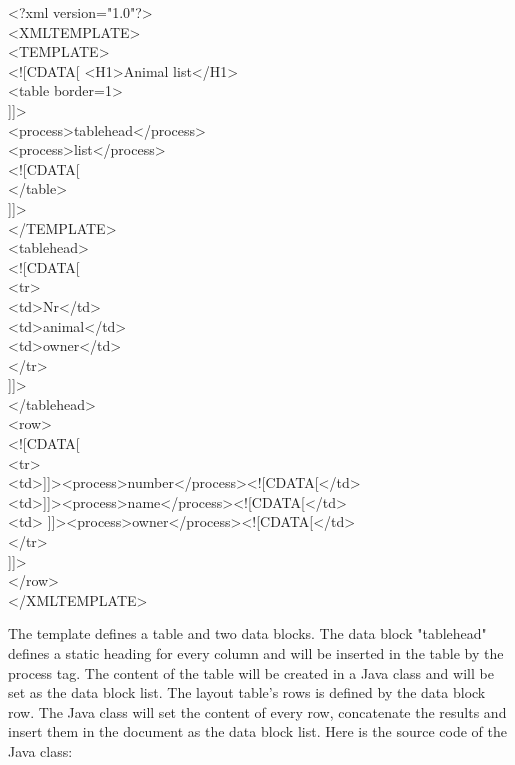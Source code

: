 \begin{xml}
<?xml version="1.0"?>\\
<XMLTEMPLATE>\\

<TEMPLATE>\\
<![CDATA[ <H1>Animal list</H1>\\
<table border=1>\\
]]>\\
<process>tablehead</process>\\
<process>list</process>\\
<![CDATA[\\
</table>\\
]]>\\
</TEMPLATE>\\
<tablehead>\\
<![CDATA[\\
<tr>\\
<td>Nr</td>\\
<td>animal</td>\\
<td>owner</td>\\
</tr>\\
]]>\\
</tablehead>\\
<row>\\
<![CDATA[\\
<tr>\\
<td>]]><process>number</process><![CDATA[</td>\\
<td>]]><process>name</process><![CDATA[</td>\\
<td> ]]><process>owner</process><![CDATA[</td>\\
</tr>\\
]]>\\
</row>\\
</XMLTEMPLATE>\\
\end{xml}


The template defines a table and two data blocks. The data block
{\tag "tablehead"} defines a static heading for every column and will be
inserted in the table by the {\tag process} tag. The content of the table will
be created in a Java class and will be set as the data block {\name list.}
The layout table's rows is defined by the data block {\name row.} The Java
class will set the content of every row, concatenate the results and
insert them in the document as the data block {\name list.} Here is the
source code of the Java class:

